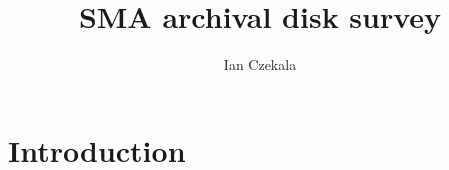 \documentclass{article}
\title{SMA archival disk survey}
\author{Ian Czekala}
\begin{document}

\section{Introduction}
\end{document}
